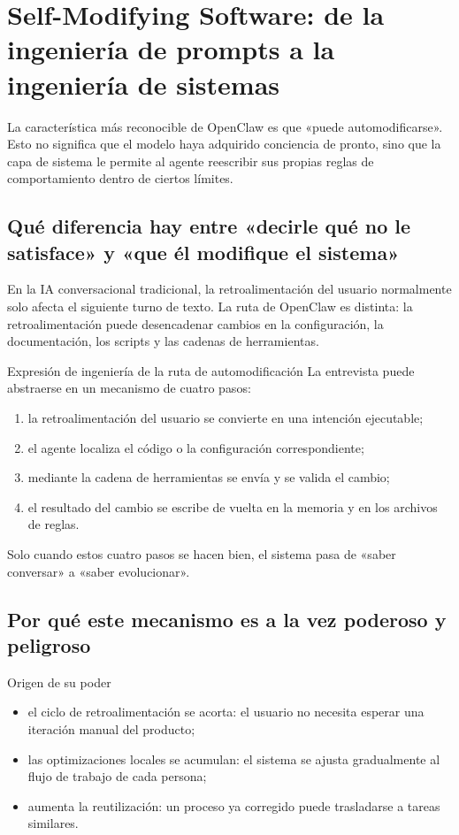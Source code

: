\section{Self-Modifying Software: de la ingeniería de prompts a la ingeniería de sistemas}

La característica más reconocible de OpenClaw es que «puede automodificarse». Esto no significa que el modelo haya adquirido conciencia de pronto, sino que la capa de sistema le permite al agente reescribir sus propias reglas de comportamiento dentro de ciertos límites.

\subsection{Qué diferencia hay entre «decirle qué no le satisface» y «que él modifique el sistema»}

En la IA conversacional tradicional, la retroalimentación del usuario normalmente solo afecta el siguiente turno de texto. La ruta de OpenClaw es distinta: la retroalimentación puede desencadenar cambios en la configuración, la documentación, los scripts y las cadenas de herramientas.

\begin{importantbox}{Expresión de ingeniería de la ruta de automodificación}
La entrevista puede abstraerse en un mecanismo de cuatro pasos:
\begin{enumerate}
    \item la retroalimentación del usuario se convierte en una intención ejecutable;
    \item el agente localiza el código o la configuración correspondiente;
    \item mediante la cadena de herramientas se envía y se valida el cambio;
    \item el resultado del cambio se escribe de vuelta en la memoria y en los archivos de reglas.
\end{enumerate}
Solo cuando estos cuatro pasos se hacen bien, el sistema pasa de «saber conversar» a «saber evolucionar».
\end{importantbox}

\subsection{Por qué este mecanismo es a la vez poderoso y peligroso}

\begin{knowledgebox}{Origen de su poder}
\begin{itemize}
    \item el ciclo de retroalimentación se acorta: el usuario no necesita esperar una iteración manual del producto;
    \item las optimizaciones locales se acumulan: el sistema se ajusta gradualmente al flujo de trabajo de cada persona;
    \item aumenta la reutilización: un proceso ya corregido puede trasladarse a tareas similares.
\end{itemize}
\end{knowledgebox}

